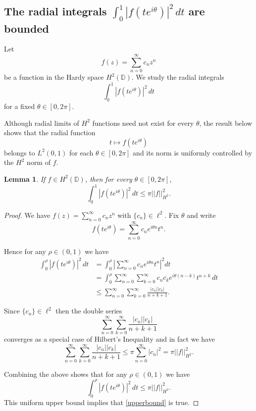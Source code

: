 \documentclass[11pt, a4paper]{article}
\newtheorem{lemma}{Lemma}[section]
\begin{document}
\subsection{The radial integrals $\int_0^1 |f(te^{i\theta})|^2\, dt$ are bounded}

Let
\[
f(z)=\sum_{n=0}^{\infty} c_n z^n
\]
be a function in the Hardy space $H^2(\mathbb{D})$.
We study the radial integrals
\[
\int_0^1 |f(te^{i\theta})|^2\, dt
\]
for a fixed $\theta\in[0,2\pi]$.


Although radial limits of $H^2$ functions need not exist for every $\theta$, the result below shows that the radial function
\[
t \mapsto f(te^{i\theta})
\]
belongs to $L^2(0,1)$ for each $\theta\in [0, 2\pi]$ and its norm is uniformly controlled by the $H^2$ norm of $f$.


\begin{lemma}\label{1}
If $f\in H^2(\mathbb{D})$, then for every $\theta\in[0,2\pi]$,
\begin{equation}\label{upperbound}
\int_{0}^{1} |f(te^{i\theta})|^2\, dt \le \pi ||f||_{H^2}^2.
\end{equation}
\end{lemma}

\begin{proof}
We have $f(z)=\sum_{n=0}^{\infty}c_n z^n$ with $\{c_n\}\in\ell^2$.
Fix $\theta$ and write
\[
f(te^{i\theta}) = \sum_{n=0}^{\infty} c_ne^{i\theta n} t^n.
\]

Hence for any $\rho\in (0,1)$ we have
\begin{align*}
\int_{0}^{\rho} |f(te^{i\theta})|^2\, dt & =
\int_{0}^{\rho} \left|\sum_{n=0}^{\infty} c_ne^{i\theta n} t^n\right|^2 dt\\
& =  \int_{0}^{\rho} \sum_{n=0}^{\infty} \sum_{k=0}^{\infty}c_n\overline{c_k}e^{i\theta (n-k)}t^{n+k}\, dt\\
& \le  \sum_{n=0}^{\infty} \sum_{k=0}^{\infty}\frac{|c_n||c_k|}{n+k+1}.
\end{align*}


Since $\{c_n\}\in\ell^2$ then the double series
\[
\sum_{n=0}^{\infty} \sum_{k=0}^{\infty}\frac{|c_n||c_k|}{n+k+1}
\]
converges as a special case of Hilbert's Inequality \cite[Theorem 323]{Polya} and
in fact we have
\[
\sum_{n=0}^{\infty} \sum_{k=0}^{\infty}\frac{|c_n||c_k|}{n+k+1}\le \pi \sum_{n=0}^{\infty}|c_n|^2=\pi ||f||^2_{H^2}.
\]


Combining the above shows that for any $\rho\in (0,1)$ we have
\[
\int_{0}^{\rho} |f(te^{i\theta})|^2\, dt \le \pi ||f||_{H^2}^2.
\]
This uniform upper bound implies that \eqref{upperbound} is true.
\end{proof}
\end{document}
